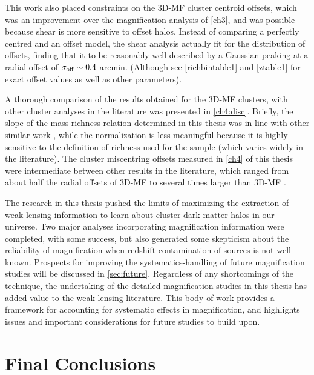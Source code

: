 This work also placed constraints on the \ac{3D-MF} cluster centroid offsets, which was an improvement over the magnification analysis of \autoref{ch3}, and was possible because shear is more sensitive to offset halos. Instead of comparing a perfectly centred and an offset model, the shear analysis actually fit for the distribution of offsets, finding that it to be reasonably well described by a Gaussian peaking at a radial offset of $\sigma_{\rm off} \sim 0.4$ arcmin. (Although see \autoref{richbintable1} and \autoref{ztable1} for exact offset values as well as other parameters). 

A thorough comparison of the results obtained for the \ac{3D-MF} clusters, with other cluster analyses in the literature was presented in \autoref{ch4:disc}. Briefly, the slope of the mass-richness relation determined in this thesis was in line with other similar work \citep{Wen12,Covone14}, while the normalization is less meaningful because it is highly sensitive to the definition of richness used for the sample (which varies widely in the literature). The cluster miscentring offsets measured in \autoref{ch4} of this thesis were intermediate between other results in the literature, which ranged from about half the radial offsets of \ac{3D-MF} \citep{George12} to several times larger than \ac{3D-MF} \citep{Johnston07}.

The research in this thesis pushed the limits of maximizing the extraction of weak lensing information to learn about cluster dark matter halos in our universe. Two major analyses incorporating magnification information were completed, with some success, but also generated some skepticism about the reliability of magnification when redshift contamination of sources is not well known. Prospects for improving the systematics-handling of future magnification studies will be discussed in \autoref{sec:future}. Regardless of any shortcomings of the technique, the undertaking of the detailed magnification studies in this thesis has added value to the weak lensing literature. This body of work provides a framework for accounting for systematic effects in magnification, and highlights issues and important considerations for future studies to build upon.


\section{Final Conclusions}
\label{sec:conc}

